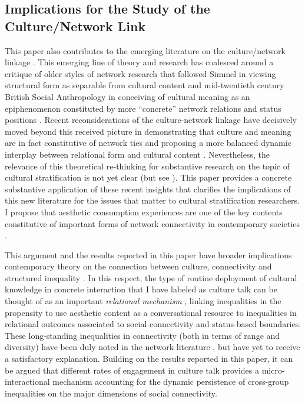 \subsection{Implications for the Study of the Culture/Network Link}
This paper also contributes to the emerging literature on the culture/network linkage \citep{fuhse09, pachucki_breiger10}.  This emerging line of theory and research  has coalesced around a critique of older styles of network research that followed Simmel in viewing structural form as separable from cultural content and mid-twentieth century British Social Anthropology in conceiving of cultural meaning as an epiphenomenon constituted by more ``concrete'' network relations and status positions  \citep{wellman88}.  Recent reconsiderations of the culture-network linkage have decisively moved beyond this received picture in demonstrating that culture and meaning are in fact constitutive of network ties and proposing a more balanced dynamic interplay between relational form and cultural content \citep{vaisey_lizardo10}.  Nevertheless, the relevance of this theoretical re-thinking for substantive research on the topic of cultural stratification is not yet clear (but see \citet{schultz_breiger10}).  This paper provides a concrete substantive application of these recent insights that clarifies the implications of this new literature for the issues that matter to cultural stratification researchers.   I propose that aesthetic consumption experiences are one of the key contents constitutive of important forms of network connectivity in contemporary societies \citep{dimaggio87}.  

This argument and the results reported in this paper have broader implications contemporary theory on the connection between culture, connectivity and structured inequality \citep{erickson08}.  In this respect, the type of routine deployment of cultural knowledge in concrete interaction that I have labeled as culture talk can be thought of as an important \emph{relational mechanism} \citep{tilly98, gross09}, linking inequalities in the propensity to use aesthetic content as a conversational resource to inequalities in relational outcomes associated to social connectivity and status-based boundaries. These long-standing inequalities in connectivity (both in terms of range and diversity) have been duly noted in the network literature \citep{lin99, erickson08}, but have yet to receive a satisfactory explanation.  Building on the results reported in this paper, it can be argued that different rates of engagement in culture talk provides a micro-interactional mechanism accounting for the dynamic persistence of cross-group inequalities on the major dimensions of social connectivity.

